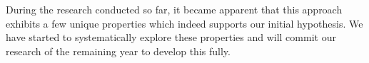 \documentclass[oneside]{book}
\begin{document}
During the research conducted so far, it became apparent that this approach exhibits a few unique properties which indeed supports our initial hypothesis. We have started to systematically explore these properties and will commit our research of the remaining year to develop this fully.

\clearpage
\tableofcontents
\clearpage















%

\renewcommand\bibname{References}





\end{document}

